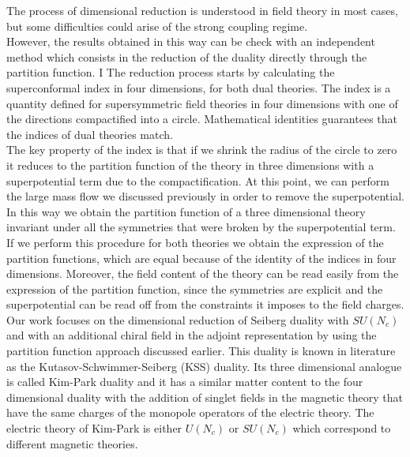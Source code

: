 The process of dimensional reduction is understood in field theory in most cases, but some difficulties could arise of the strong coupling regime.\\
However, the results obtained in this way can be check with an independent method which consists in the reduction of the duality directly through the partition function.
I%
The reduction process starts by calculating the superconformal index in four dimensions, for both dual theories. 
The index is a quantity defined for supersymmetric field theories in four dimensions with one of the directions compactified into a circle.
Mathematical identities guarantees that the indices of dual theories match.\\
The key property of the index is that if we shrink the radius of the circle to zero it reduces to the partition function of the theory in three dimensions with a superpotential term due to the compactification.
At this point, we can perform the large mass flow we discussed previously in order to remove the superpotential. 
In this way we obtain the partition function of a three dimensional theory invariant under all the symmetries that were broken by the superpotential term.\\
If we perform this procedure for both theories we obtain the expression of the partition functions, which are equal because of the identity of the indices in four dimensions.
Moreover, the field content of the theory can be read easily from the expression of the partition function, since the symmetries are explicit and the superpotential can be read off from the constraints it imposes to the field charges.\\  
Our work focuses on the dimensional reduction of Seiberg duality with $SU(N_c)$ and with an additional chiral field in the adjoint representation by using the partition function approach discussed earlier.
This duality is known in literature as the Kutasov-Schwimmer-Seiberg (KSS) duality.
Its three dimensional analogue is called Kim-Park duality and it has a similar matter content to the four dimensional duality with the addition of singlet fields in the magnetic theory that have the same charges of the monopole operators of the electric theory.
The electric theory of Kim-Park is either $U(N_c)$ or $SU(N_c)$ which correspond to different magnetic theories. 
 \\
